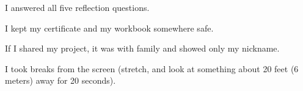 \begin{selfcheck}
  \item I answered all five reflection questions.
  \item I kept my certificate and my workbook somewhere safe.
  \item If I shared my project, it was with family and showed only my nickname.
  \item I took breaks from the screen (stretch, and look at something about 20 feet (6 meters) away for 20 seconds).
\end{selfcheck}
